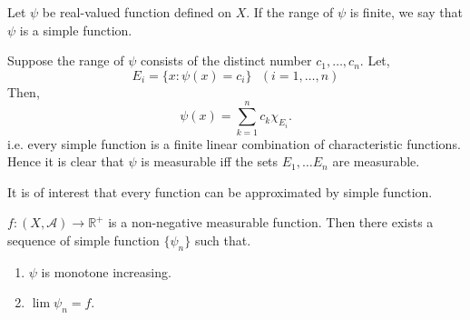 \begin{definition}
    Let $\psi$ be real-valued function defined on  $X$. If the range of  $\psi$ is finite, we say that  $\psi$ is a simple function.
\end{definition}
Suppose the range of $\psi$ consists of the distinct number  $c_1,\ldots,c_n$. Let,
\[
    E_i=\{x:\psi(x)=c_i\}\ \ \ (i=1,\ldots,n)
\]
Then,
\[
    \psi(x)=\sum_{k=1}^{n}c_k\chi_{E_{i}}.
\]
i.e. every simple function is a finite linear combination of characteristic functions. Hence it is clear that $\psi$ is measurable iff the sets  $E_1,\ldots E_n$
are measurable.

It is of interest that every function can be approximated by simple function.
\begin{theorem}
    $f:(X,\mathcal{A})\to\mathds{R}^{+}$ is a non-negative measurable function. Then there exists a sequence of simple function $\{\psi_n\}$ such that.
     \begin{enumerate}
         \item $\psi$ is monotone increasing.
         \item  $\lim\psi_n=f$.
    \end{enumerate}
\end{theorem}
